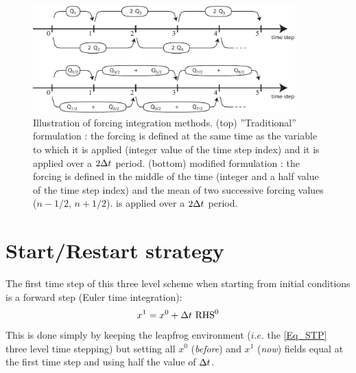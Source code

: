 \begin{figure}[!t] 	  \begin{center}
\includegraphics[width=0.90\textwidth]{./TexFiles/Figures/Fig_MLF_forcing.pdf}
\caption{ 	\label{Fig_MLF_forcing}
Illustration of forcing integration methods. 
(top) ''Traditional'' formulation : the forcing is defined at the same time as the variable 
to which it is applied (integer value of the time step index) and it is applied over a $2\Delta t$ period. 
(bottom)  modified formulation : the forcing is defined in the middle of the time (integer and a half 
value of the time step index) and the mean of two successive forcing values ($n-1/2$, $n+1/2$).
is applied over a $2\Delta t$ period.}
\end{center}   \end{figure}

\section{Start/Restart strategy}
\label{STP_rst}

The first time step of this three level scheme when starting from initial conditions 
is a forward step (Euler time integration): 
\begin{equation} \label{Eq_DOM_euler}
	x^1 = x^0 + \Delta t \ \text{RHS}^0
\end{equation}
This is done simply by keeping the leapfrog environment ($i.e.$ the \eqref{Eq_STP} 
three level time stepping) but setting all $x^0$ (\textit{before}) and $x^{1}$ (\textit{now}) fields 
equal at the first time step and using half the value of $\Delta t$.


